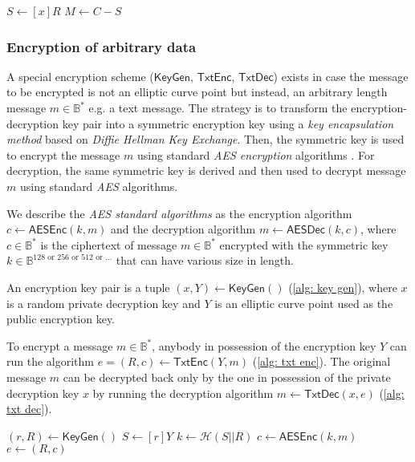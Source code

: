\begin{algorithm}[ht]
    \DontPrintSemicolon
    \caption{$\mathsf{Dec} (x, e)$}
    
    $S \gets [x]R$ \;
    $M \gets C - S$ \;
     
    
    \label{alg: dec}
\end{algorithm}


\subsubsection{Encryption of arbitrary data}
A special encryption scheme ($\mathsf{KeyGen}$, $\mathsf{TxtEnc}$, $\mathsf{TxtDec}$) exists in case the message to be encrypted is not an elliptic curve point but instead, an arbitrary length message $m \in \mathbb{B}^*$ e.g. a text message. The strategy is to transform the encryption-decryption key pair into a symmetric encryption key using a \textit{key encapsulation method} based on \textit{Diffie Hellman Key Exchange}. Then, the symmetric key is used to encrypt the message $m$ using standard \textit{AES encryption} algorithms \cite{NIST01}. For decryption, the same symmetric key is derived and then used to decrypt message $m$ using standard \textit{AES} algorithms.

We describe the \textit{AES standard algorithms} as the encryption algorithm $c \gets \mathsf{AESEnc} (k, m)$ and the decryption algorithm $m \gets \mathsf{AESDec} (k, c)$, where $c \in \mathbb{B}^*$ is the ciphertext of message $m \in \mathbb{B}^*$ encrypted with the symmetric key $k \in \mathbb{B}^{128 \text{ or } 256 \text{ or } 512 \text{ or ...}}$ that can have various size in length.

An encryption key pair is a tuple $(x, Y) \gets \mathsf{KeyGen}()$ (\cref{alg: key gen}), where $x$ is a random private decryption key and $Y$ is an elliptic curve point used as the public encryption key.

To encrypt a message $m \in \mathbb{B}^*$, anybody in possession of the encryption key $Y$ can run the algorithm $e = (R, c) \gets \mathsf{TxtEnc} (Y, m)$ (\cref{alg: txt enc}). The original message $m$ can be decrypted back only by the one in possession of the private decryption key $x$ by running the decryption algorithm $m \gets \mathsf{TxtDec} (x, e)$ (\cref{alg: txt dec}).

\begin{algorithm}[ht]
    \DontPrintSemicolon
    \caption{$\mathsf{TxtEnc} (Y, m)$}
    
    $(r, R) \gets \mathsf{KeyGen}()$ 
    $S \gets [r]Y$ \;
    $k \gets \mathcal{H} (S || R)$ \;
    $c \gets \mathsf{AESEnc} (k, m)$ \;
    $e \gets (R, c)$ \;
     
    
    \label{alg: txt enc}
\end{algorithm}

